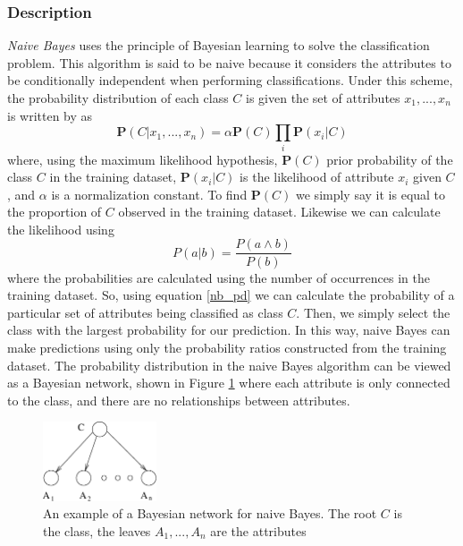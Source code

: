\documentclass{article}
\newcommand{\ve}[1]{\boldsymbol{\mathbf{#1}}}
\begin{document}
			\subsubsection{Description}
				\label{nb_des}
				\textit{Naive Bayes} uses the principle of Bayesian learning to solve the classification problem. 
				This algorithm is said to be naive because it considers the attributes to be conditionally independent when performing classifications. 
				Under this scheme, the probability distribution of each class $C$ is given the set of attributes $x_1,...,x_n$ is written by \cite{ai} as
				\begin{equation}					
					\ve{P}(C|x_1,...,x_n) = \alpha \ve{P}(C) \prod_i \ve{P}(x_i| C) \label{nb_pd}
				\end{equation}
				where, using the maximum likelihood hypothesis, $\ve{P}(C)$ prior probability of the class $C$ in the training dataset, $\ve{P}(x_i|C)$ is the likelihood of attribute $x_i$ given $C$, and $\alpha$ is a normalization constant. 
				To find $\ve{P}(C)$ we simply say it is equal to the proportion of $C$ observed in the training dataset. 
				Likewise we can calculate the likelihood using
				\begin{equation*}
					P(a|b) = \frac{P(a \land b)}{P(b)}
				\end{equation*}
				where the probabilities are calculated using the number of occurrences in the training dataset. 
				So, using equation \ref{nb_pd} we can calculate the probability of a particular set of attributes being classified as class $C$. 
				Then, we simply select the class with the largest probability for our prediction. 
				In this way, naive Bayes can make predictions using only the probability ratios constructed from the training dataset. 
				The probability distribution in the naive Bayes algorithm can be viewed as a Bayesian network, shown in Figure \ref{nb} where each attribute is only connected to the class, and there are no relationships between attributes.
				\begin{figure}[h]
					\centering
					\includegraphics[width=0.3\textwidth]{fig/nb}
					\caption{An example of a Bayesian network for naive Bayes. The root $C$ is the class, the leaves $A_1,...,A_n$ are the attributes \cite{Friedman1997}}
					\label{nb}
				\end{figure}
\end{document}
